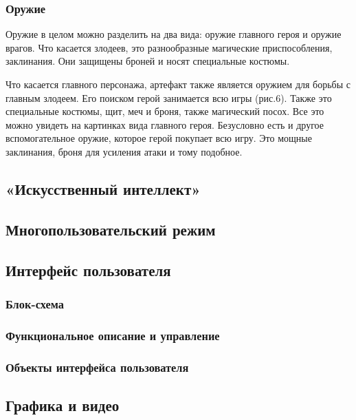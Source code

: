 \documentclass{article}
\begin{document}
\subsubsection{Оружие}
\par Оружие в целом можно разделить на два вида: оружие главного героя и оружие врагов. Что касается злодеев, это разнообразные магические приспособления, заклинания. Они защищены броней и носят специальные костюмы. 
\par Что касается главного персонажа, артефакт также является оружием для борьбы с главным злодеем. Его поиском герой занимается всю игры (рис.6). Также это специальные костюмы, щит, меч и броня, также магический посох. Все это можно увидеть на картинках вида главного героя. 
Безусловно есть и другое вспомогательное оружие, которое герой покупает всю игру. Это мощные заклинания, броня для усиления атаки и тому подобное.

\subsection{«Искусственный интеллект»}

\subsection{Многопользовательский режим}

\subsection{Интерфейс пользователя}

\subsubsection{Блок-схема}

\subsubsection{Функциональное описание и управление}

\subsubsection{Объекты интерфейса пользователя}

\subsection{Графика и видео}
\end{document}
